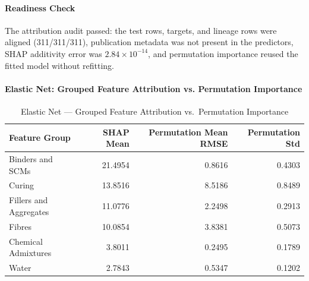 \documentclass{article}
\begin{document}
\paragraph{Readiness Check}
The attribution audit passed: the test rows, targets, and lineage rows were aligned (311/311/311), publication metadata was not present in the predictors, SHAP additivity error was $2.84 \times 10^{-14}$, and permutation importance reused the fitted model without refitting.

\paragraph{Elastic Net: Grouped Feature Attribution vs. Permutation Importance}
\begin{table}[H]
\centering
\caption{Elastic Net --- Grouped Feature Attribution vs.\ Permutation Importance}
\label{tab:elastic_group_importance}
\begin{tabular}{lrrr}
\toprule
Feature Group & SHAP Mean & Permutation Mean RMSE & Permutation Std \\
\midrule
Binders and SCMs        & 21.4954 & 0.8616 & 0.4303 \\
Curing                  & 13.8516 & 8.5186 & 0.8489 \\
Fillers and Aggregates  & 11.0776 & 2.2498 & 0.2913 \\
Fibres                  & 10.0854 & 3.8381 & 0.5073 \\
Chemical Admixtures     &  3.8011 & 0.2495 & 0.1789 \\
Water                   &  2.7843 & 0.5347 & 0.1202 \\
\bottomrule
\end{tabular}
\end{table}
\end{document}
